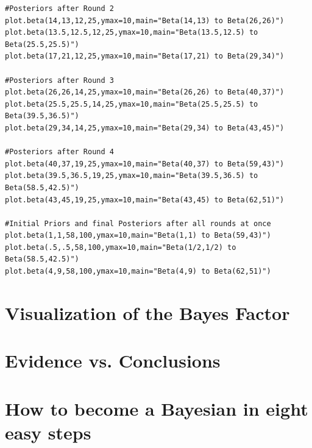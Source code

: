 \begin{lstlisting}
#Posteriors after Round 2
plot.beta(14,13,12,25,ymax=10,main="Beta(14,13) to Beta(26,26)")
plot.beta(13.5,12.5,12,25,ymax=10,main="Beta(13.5,12.5) to Beta(25.5,25.5)")
plot.beta(17,21,12,25,ymax=10,main="Beta(17,21) to Beta(29,34)")

#Posteriors after Round 3
plot.beta(26,26,14,25,ymax=10,main="Beta(26,26) to Beta(40,37)")
plot.beta(25.5,25.5,14,25,ymax=10,main="Beta(25.5,25.5) to Beta(39.5,36.5)")
plot.beta(29,34,14,25,ymax=10,main="Beta(29,34) to Beta(43,45)")

#Posteriors after Round 4
plot.beta(40,37,19,25,ymax=10,main="Beta(40,37) to Beta(59,43)")
plot.beta(39.5,36.5,19,25,ymax=10,main="Beta(39.5,36.5) to Beta(58.5,42.5)")
plot.beta(43,45,19,25,ymax=10,main="Beta(43,45) to Beta(62,51)")

#Initial Priors and final Posteriors after all rounds at once
plot.beta(1,1,58,100,ymax=10,main="Beta(1,1) to Beta(59,43)")
plot.beta(.5,.5,58,100,ymax=10,main="Beta(1/2,1/2) to Beta(58.5,42.5)")
plot.beta(4,9,58,100,ymax=10,main="Beta(4,9) to Beta(62,51)")
\end{lstlisting}

\section{Visualization of the Bayes Factor}
\label{sec:VisualizationoftheBayesFactor}



\section{Evidence vs. Conclusions}
\label{sec:Evidencevs.Conclusions}



\section{How to become a Bayesian in eight easy steps}
\label{sec:HowtobecomeaBayesianineighteasysteps}




